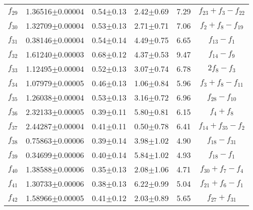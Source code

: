 \documentclass[useAMS,usenatbib,usegraphicx]{mn2e}
\begin{document}
\begin{table}
\begin{tabular}{lccccc}
$f_{29}$     & 1.36516$\pm$0.00004    & 0.54$\pm$0.13       & 2.42$\pm$0.69   &  7.29          & $f_{23}+f_3-f_{22}$        \\
$f_{30}$     & 1.32709$\pm$0.00004    & 0.53$\pm$0.13       & 2.71$\pm$0.71   &  7.06          & $f_2+f_8-f_{19}$           \\
$f_{31}$     & 0.38146$\pm$0.00004    & 0.54$\pm$0.14       & 4.49$\pm$0.75   &  6.65          & $f_{13}-f_1$               \\
$f_{32}$     & 1.61240$\pm$0.00003    & 0.68$\pm$0.12       & 4.37$\pm$0.53   &  9.47          & $f_{14}-f_9$               \\
$f_{33}$     & 1.12495$\pm$0.00004    & 0.52$\pm$0.13       & 3.07$\pm$0.74   &  6.78          & $2f_8-f_3$                 \\
$f_{34}$     & 1.07979$\pm$0.00005    & 0.46$\pm$0.13       & 1.06$\pm$0.84   &  5.96          & $f_3+f_8-f_{11}$           \\
$f_{35}$     & 1.26038$\pm$0.00004    & 0.53$\pm$0.13       & 3.16$\pm$0.72   &  6.96          & $f_{28}-f_{10}$            \\
$f_{36}$     & 2.32133$\pm$0.00005    & 0.39$\pm$0.11       & 5.80$\pm$0.81   &  6.15          & $f_4+f_8$                  \\
$f_{37}$     & 2.44287$\pm$0.00004    & 0.41$\pm$0.11       & 0.50$\pm$0.78   &  6.41          & $f_{14}+f_{35}-f_2$        \\
$f_{38}$     & 0.75863$\pm$0.00006    & 0.39$\pm$0.14       & 3.98$\pm$1.02   &  4.90          & $f_{18}-f_{31}$            \\
$f_{39}$     & 0.34699$\pm$0.00006    & 0.40$\pm$0.14       & 5.84$\pm$1.02   &  4.93          & $f_{18}-f_1$               \\
$f_{40}$     & 1.38588$\pm$0.00006    & 0.35$\pm$0.13       & 2.08$\pm$1.06   &  4.71          & $f_{30}+f_7-f_4$           \\
$f_{41}$     & 1.30733$\pm$0.00006    & 0.38$\pm$0.13       & 6.22$\pm$0.99   &  5.04          & $f_{21}+f_6-f_1$           \\
$f_{42}$     & 1.58966$\pm$0.00005    & 0.41$\pm$0.12       & 2.03$\pm$0.89   &  5.65          & $f_{27}+f_{31}$            \\
\hline
\end{tabular}
\end{table}
\end{document}
